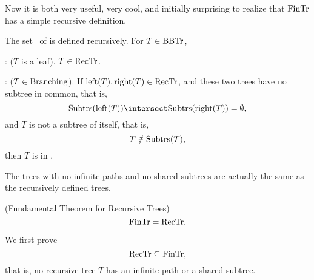 Now it is both very useful, very cool, and initially surprising to
realize that $\text{FinTr}$ has a simple recursive definition.

\begin{definition}
The set \rectr\ of  is defined recursively.  For
$T \in \text{BBTr}$,

: ($T$ is a leaf).  $T \in \text{RecTr}$.

: ($T \in \text{Branching}$).
If $\text{left}(T), \text{right}(T) \in \text{RecTr}$, and these two trees
have no subtree in common, that is,
\[
\subbrn{\leftsub{(T)}} \intersect \subbrn{\rightsub{(T)}} = \emptyset,
\]
and $T$ is not a subtree of itself, that is,
\[
T \notin \text{Subtrs}(T),
\]
then $T$ is in \rectr.
\end{definition}

The trees with no infinite paths and no shared subtrees are actually
the same as the recursively defined trees.

\begin{theorem}\label{fundthmrec}(Fundamental Theorem for Recursive Trees)
\[
\text{FinTr} = \text{RecTr}.
\]
\end{theorem}

We first prove
\begin{equation}\label{rectrsubfintr}
\text{RecTr} \subseteq \text{FinTr},
\end{equation}
that is, no recursive tree $T$ has an infinite path or a shared subtree.

